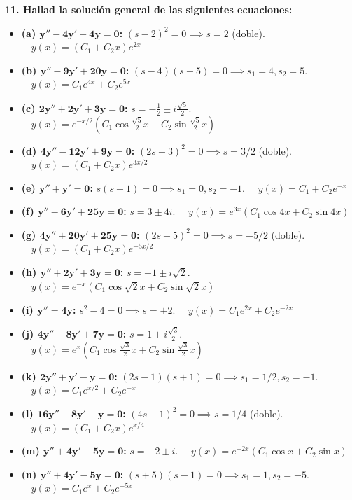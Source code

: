 \documentclass[11pt, a4paper]{article}
\begin{document}
\noindent\textbf{11. Hallad la solución general de las siguientes ecuaciones:}

\begin{itemize}
\item \textbf{(a) $\bm{y''-4y'+4y=0}$:} $(s-2)^2 = 0 \implies s = 2$ (doble). $\quad \boxed{y(x) = (C_1 + C_2 x)e^{2x}}$
\item \textbf{(b) $\bm{y''-9y'+20y=0}$:} $(s-4)(s-5) = 0 \implies s_1 = 4, s_2 = 5$. $\quad \boxed{y(x) = C_1 e^{4x} + C_2 e^{5x}}$
\item \textbf{(c) $\bm{2y''+2y'+3y=0}$:} $s = -\frac{1}{2} \pm i\frac{\sqrt{5}}{2}$. $\quad \boxed{y(x) = e^{-x/2}\left(C_1 \cos\frac{\sqrt{5}}{2}x + C_2 \sin\frac{\sqrt{5}}{2}x\right)}$
\item \textbf{(d) $\bm{4y''-12y'+9y=0}$:} $(2s-3)^2 = 0 \implies s = 3/2$ (doble). $\quad \boxed{y(x) = (C_1 + C_2 x)e^{3x/2}}$
\item \textbf{(e) $\bm{y''+y'=0}$:} $s(s+1) = 0 \implies s_1 = 0, s_2 = -1$. $\quad \boxed{y(x) = C_1 + C_2 e^{-x}}$
\item \textbf{(f) $\bm{y''-6y'+25y=0}$:} $s = 3 \pm 4i$. $\quad \boxed{y(x) = e^{3x}(C_1 \cos 4x + C_2 \sin 4x)}$
\item \textbf{(g) $\bm{4y''+20y'+25y=0}$:} $(2s+5)^2 = 0 \implies s = -5/2$ (doble). $\quad \boxed{y(x) = (C_1 + C_2 x)e^{-5x/2}}$
\item \textbf{(h) $\bm{y''+2y'+3y=0}$:} $s = -1 \pm i\sqrt{2}$. $\quad \boxed{y(x) = e^{-x}(C_1 \cos\sqrt{2}x + C_2 \sin\sqrt{2}x)}$
\item \textbf{(i) $\bm{y''=4y}$:} $s^2 - 4 = 0 \implies s = \pm 2$. $\quad \boxed{y(x) = C_1 e^{2x} + C_2 e^{-2x}}$
\item \textbf{(j) $\bm{4y''-8y'+7y=0}$:} $s = 1 \pm i\frac{\sqrt{3}}{2}$. $\quad \boxed{y(x) = e^x\left(C_1 \cos\frac{\sqrt{3}}{2}x + C_2 \sin\frac{\sqrt{3}}{2}x\right)}$
\item \textbf{(k) $\bm{2y''+y'-y=0}$:} $(2s-1)(s+1) = 0 \implies s_1 = 1/2, s_2 = -1$. $\quad \boxed{y(x) = C_1 e^{x/2} + C_2 e^{-x}}$
\item \textbf{(l) $\bm{16y''-8y'+y=0}$:} $(4s-1)^2 = 0 \implies s = 1/4$ (doble). $\quad \boxed{y(x) = (C_1 + C_2 x)e^{x/4}}$
\item \textbf{(m) $\bm{y''+4y'+5y=0}$:} $s = -2 \pm i$. $\quad \boxed{y(x) = e^{-2x}(C_1 \cos x + C_2 \sin x)}$
\item \textbf{(n) $\bm{y''+4y'-5y=0}$:} $(s+5)(s-1) = 0 \implies s_1 = 1, s_2 = -5$. $\quad \boxed{y(x) = C_1 e^x + C_2 e^{-5x}}$\\
\end{itemize}
\end{document}
